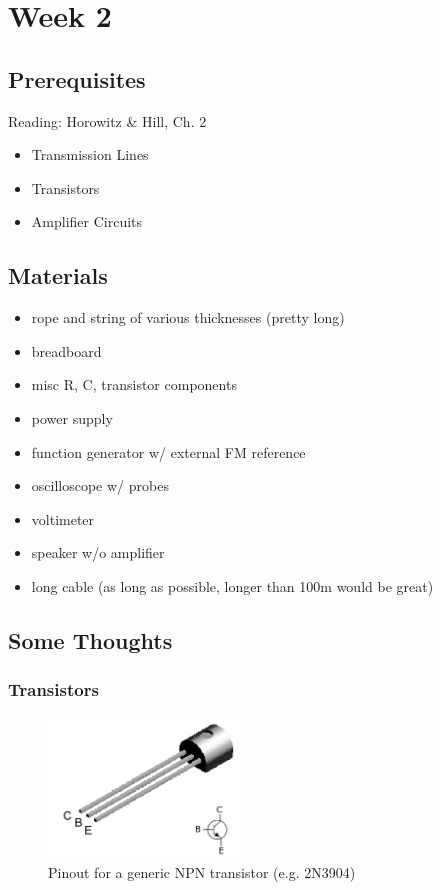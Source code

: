 \documentclass[11pt]{article}
\begin{document}
\section{Week 2}
\label{sec:week2}
\subsection*{Prerequisites}

Reading: Horowitz \& Hill, Ch. 2

\begin{itemize}[noitemsep,nolistsep]
\item Transmission Lines
\item Transistors
\item Amplifier Circuits
\end{itemize}

\subsection*{Materials}

\begin{itemize}[noitemsep,nolistsep]
\item rope and string of various thicknesses (pretty long)
\item breadboard
\item misc R, C, transistor components
\item power supply
\item function generator w/ external FM reference
\item oscilloscope w/ probes
\item voltimeter
\item speaker w/o amplifier
\item long cable (as long as possible, longer than 100m would be great)
\end{itemize}

\subsection*{Some Thoughts}

\subsubsection*{Transistors}

\begin{figure}\centering
\includegraphics[width=2in]{plots/npn_transistor_pins.png}
\caption{Pinout for a generic NPN transistor (e.g. 2N3904)}
\label{fig:npn_transistor_pins}
\end{figure}
\end{document}
